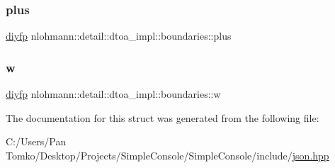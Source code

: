 \mbox{\label{structnlohmann_1_1detail_1_1dtoa__impl_1_1boundaries_a3321ae2816a6ec5250a0d8e29f798232}} 
\subsubsection{\texorpdfstring{plus}{plus}}
{\footnotesize\ttfamily \mbox{\hyperlink{structnlohmann_1_1detail_1_1dtoa__impl_1_1diyfp}{diyfp}} nlohmann\+::detail\+::dtoa\+\_\+impl\+::boundaries\+::plus}

\mbox{\label{structnlohmann_1_1detail_1_1dtoa__impl_1_1boundaries_ad1668c60aeade5f2557fafed8b8aee1a}} 
\subsubsection{\texorpdfstring{w}{w}}
{\footnotesize\ttfamily \mbox{\hyperlink{structnlohmann_1_1detail_1_1dtoa__impl_1_1diyfp}{diyfp}} nlohmann\+::detail\+::dtoa\+\_\+impl\+::boundaries\+::w}



The documentation for this struct was generated from the following file\+:\begin{DoxyCompactItemize}
\item 
C\+:/\+Users/\+Pan Tomko/\+Desktop/\+Projects/\+Simple\+Console/\+Simple\+Console/include/\mbox{\hyperlink{json_8hpp}{json.\+hpp}}\end{DoxyCompactItemize}

